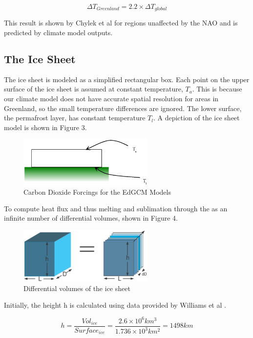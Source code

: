 \documentclass[12pt,a4paper,titlepage]{article}
\begin{document}
\[
\Delta T_{Greenland}=2.2\times\Delta T_{global}
\]

This result is shown by Chylek et al for regions unaffected by the
NAO and is predicted by climate model outputs.

\subsection{The Ice Sheet}

The ice sheet is modeled as a simplified rectangular box. Each
point on the upper surface of the ice sheet is assumed at constant
temperature, $T_a$. This is because our climate model does not
have accurate spatial resolution for areas in Greenland, so the
small temperature differences are ignored. The lower surface, the
permafrost layer, has constant temperature $T_l$. A depiction of
the ice sheet model is shown in Figure 3.

\begin{figure}[!htb]
\centering
\includegraphics[width=0.6\textwidth]{fig03.eps}
\caption{Carbon Dioxide Forcings for the EdGCM Models}
\end{figure}

To compute heat flux and thus melting and sublimation through the
as an infinite number of differential volumes, shown in Figure 4.

\begin{figure}[!htb]
\centering
\includegraphics[width=0.6\textwidth]{fig04.eps}
\caption{Differential volumes of the ice sheet}
\end{figure}

Initially, the height h is calculated using data provided by
Williams et al .

\[
h=\frac{Vol_{ice}}{Surface_{ice}}=\frac{2.6\times10^{6}km^3}{1.736\times
10^3km^2 }=1498km
\]
\end{document}
